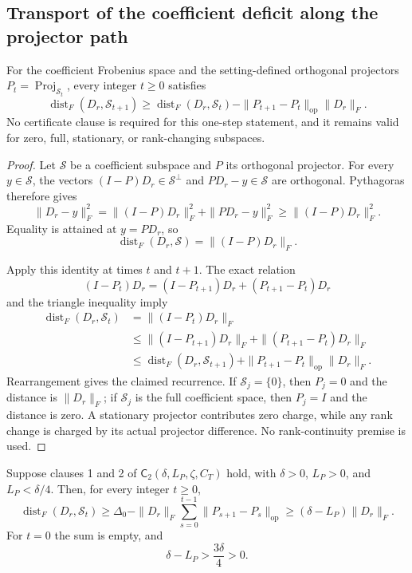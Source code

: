 \subsection{Transport of the coefficient deficit along the projector path}
\label{app:step-002}

\begin{lemma}
\label{lem:step-002-one-step-transport}
For the coefficient Frobenius space and the setting-defined orthogonal
projectors $P_t=\operatorname{Proj}_{\mathcal S_t}$, every integer $t\geq0$
satisfies
\[
\operatorname{dist}_F(D_r,\mathcal S_{t+1})
\geq
\operatorname{dist}_F(D_r,\mathcal S_t)
-\|P_{t+1}-P_t\|_{\mathrm{op}}\|D_r\|_F.
\]
No certificate clause is required for this one-step statement, and it remains
valid for zero, full, stationary, or rank-changing subspaces.
\end{lemma}

\begin{proof}
Let $\mathcal S$ be a coefficient subspace and $P$ its orthogonal projector.
For every $y\in\mathcal S$, the vectors
$(I-P)D_r\in\mathcal S^\perp$ and $PD_r-y\in\mathcal S$ are orthogonal.
Pythagoras therefore gives
\[
\|D_r-y\|_F^2
=\|(I-P)D_r\|_F^2+\|PD_r-y\|_F^2
\geq\|(I-P)D_r\|_F^2.
\]
Equality is attained at $y=PD_r$, so
\[
\operatorname{dist}_F(D_r,\mathcal S)=\|(I-P)D_r\|_F.
\]

Apply this identity at times $t$ and $t+1$.  The exact relation
\[
(I-P_t)D_r=(I-P_{t+1})D_r+(P_{t+1}-P_t)D_r
\]
and the triangle inequality imply
\[
\begin{aligned}
\operatorname{dist}_F(D_r,\mathcal S_t)
&=\|(I-P_t)D_r\|_F\\
&\leq\|(I-P_{t+1})D_r\|_F
   +\|(P_{t+1}-P_t)D_r\|_F\\
&\leq\operatorname{dist}_F(D_r,\mathcal S_{t+1})
   +\|P_{t+1}-P_t\|_{\mathrm{op}}\|D_r\|_F.
\end{aligned}
\]
Rearrangement gives the claimed recurrence.  If $\mathcal S_j=\{0\}$,
then $P_j=0$ and the distance is $\|D_r\|_F$; if $\mathcal S_j$ is the
full coefficient space, then $P_j=I$ and the distance is zero.  A stationary
projector contributes zero charge, while any rank change is charged by its
actual projector difference.  No rank-continuity premise is used.
\end{proof}

\begin{proposition}
\label{prop:step-002-all-time-deficit}
Suppose clauses 1 and 2 of
$\mathsf C_2(\delta,L_P,\zeta,C_T)$ hold, with
$\delta>0$, $L_P>0$, and $L_P<\delta/4$.  Then, for every integer
$t\geq0$,
\[
\operatorname{dist}_F(D_r,\mathcal S_t)
\geq
\Delta_0-\|D_r\|_F
\sum_{s=0}^{t-1}\|P_{s+1}-P_s\|_{\mathrm{op}}
\geq(\delta-L_P)\|D_r\|_F.
\]
For $t=0$ the sum is empty, and
\[
\delta-L_P>\frac{3\delta}{4}>0.
\]
\end{proposition}

